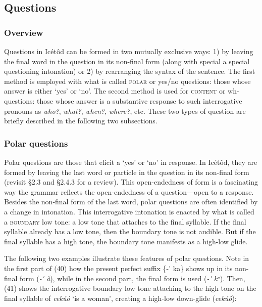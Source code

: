 \subsection{Questions}
\subsubsection{Overview}

Questions in Icétôd can be formed in two mutually exclusive ways: 1) by leaving the final word in the question in its non-final form (along with special a special questioning intonation) or 2) by rearranging the syntax of the sentence. The first method is employed with what is called \textsc{polar} or yes/no questions: those whose answer is either ‘yes’ or ‘no’. The second method is used for \textsc{content} or wh-questions: those whose answer is a substantive response to such interrogative pronouns as \textit{who?}, \textit{what?}, \textit{when?}, \textit{where?}, etc. These two types of question are briefly described in the following two subsections.


\subsubsection{Polar questions}

Polar questions are those that elicit a ‘yes’ or ‘no’ in response. In Icétôd, they are formed by leaving the last word or particle in the question in its non-final form (revisit §2.3 and §2.4.3 for a review). This open-endedness of form is a fascinating way the grammar reflects the open-endedness of a question—open to a response. Besides the non-final form of the last word, polar questions are often identified by a change in intonation. This interrogative intonation is enacted by what is called a \textsc{boundary} low tone: a low tone that attaches to the final syllable. If the final syllable already has a low tone, then the boundary tone is not audible. But if the final syllable has a high tone, the boundary tone manifests as a high-low glide. 

The following two examples illustrate these features of polar questions. Note in the first part of (40) how the present perfect suffix \{-\'{} ka\} shows up in its non-final form (\textit{{}-\'{} à}), while in the second part, the final form is used (\textit{{}-\'{} kᵃ}). Then, (41) shows the interrogative boundary low tone attaching to the high tone on the final syllable of \textit{cekúó} ‘is a woman’, creating a high-low down-glide (\textit{cekúô}):




